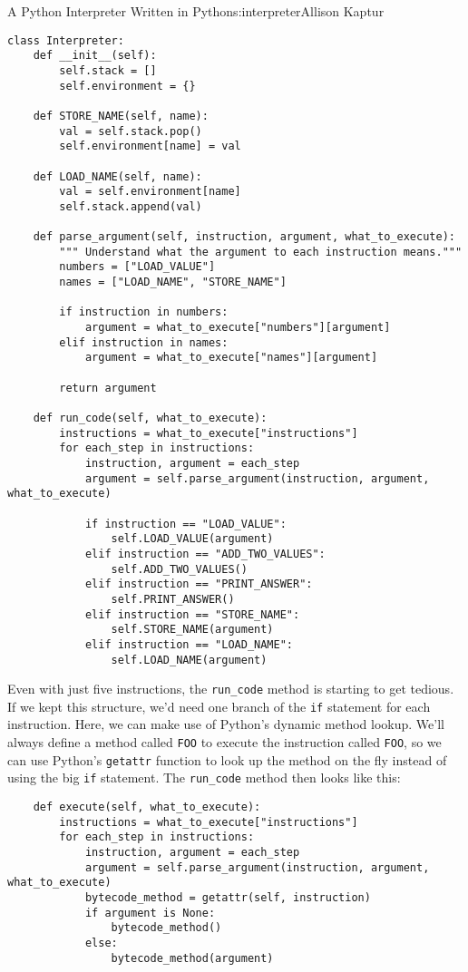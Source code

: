 \begin{aosachapter}{A Python Interpreter Written in Python}{s:interpreter}{Allison Kaptur}
\begin{verbatim}
class Interpreter:
    def __init__(self):
        self.stack = []
        self.environment = {}

    def STORE_NAME(self, name):
        val = self.stack.pop()
        self.environment[name] = val

    def LOAD_NAME(self, name):
        val = self.environment[name]
        self.stack.append(val)

    def parse_argument(self, instruction, argument, what_to_execute):
        """ Understand what the argument to each instruction means."""
        numbers = ["LOAD_VALUE"]
        names = ["LOAD_NAME", "STORE_NAME"]

        if instruction in numbers:
            argument = what_to_execute["numbers"][argument]
        elif instruction in names:
            argument = what_to_execute["names"][argument]

        return argument

    def run_code(self, what_to_execute):
        instructions = what_to_execute["instructions"]
        for each_step in instructions:
            instruction, argument = each_step
            argument = self.parse_argument(instruction, argument, what_to_execute)

            if instruction == "LOAD_VALUE":
                self.LOAD_VALUE(argument)
            elif instruction == "ADD_TWO_VALUES":
                self.ADD_TWO_VALUES()
            elif instruction == "PRINT_ANSWER":
                self.PRINT_ANSWER()
            elif instruction == "STORE_NAME":
                self.STORE_NAME(argument)
            elif instruction == "LOAD_NAME":
                self.LOAD_NAME(argument)
\end{verbatim}

Even with just five instructions, the \texttt{run\_code} method is
starting to get tedious. If we kept this structure, we'd need one branch
of the \texttt{if} statement for each instruction. Here, we can make use
of Python's dynamic method lookup. We'll always define a method called
\texttt{FOO} to execute the instruction called \texttt{FOO}, so we can
use Python's \texttt{getattr} function to look up the method on the fly
instead of using the big \texttt{if} statement. The \texttt{run\_code}
method then looks like this:

\begin{verbatim}
    def execute(self, what_to_execute):
        instructions = what_to_execute["instructions"]
        for each_step in instructions:
            instruction, argument = each_step
            argument = self.parse_argument(instruction, argument, what_to_execute)
            bytecode_method = getattr(self, instruction)
            if argument is None:
                bytecode_method()
            else:
                bytecode_method(argument)
\end{verbatim}


\end{aosachapter}

